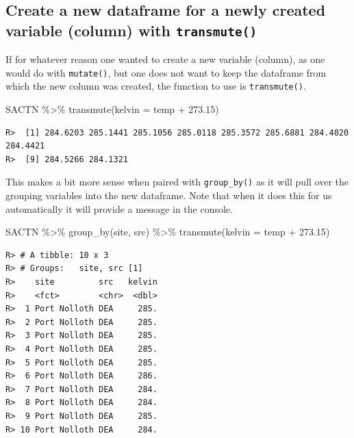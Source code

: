 \documentclass[
]{book}
\newenvironment{Shaded}{\begin{snugshade}}{\end{snugshade}}
\newcommand{\AttributeTok}[1]{\textcolor[rgb]{0.77,0.63,0.00}{#1}}
\newcommand{\FloatTok}[1]{\textcolor[rgb]{0.00,0.00,0.81}{#1}}
\newcommand{\FunctionTok}[1]{\textcolor[rgb]{0.00,0.00,0.00}{#1}}
\newcommand{\NormalTok}[1]{#1}
\newcommand{\SpecialCharTok}[1]{\textcolor[rgb]{0.00,0.00,0.00}{#1}}
\begin{document}
\hypertarget{create-a-new-dataframe-for-a-newly-created-variable-column-with-transmute}{%
\subsection{\texorpdfstring{Create a new dataframe for a newly created variable (column) with \texttt{transmute()}}{Create a new dataframe for a newly created variable (column) with transmute()}}\label{create-a-new-dataframe-for-a-newly-created-variable-column-with-transmute}}

If for whatever reason one wanted to create a new variable (column), as one would do with \texttt{mutate()}, but one does not want to keep the dataframe from which the new column was created, the function to use is \texttt{transmute()}.

\begin{Shaded}
\begin{Highlighting}[]
\NormalTok{SACTN }\SpecialCharTok{\%\textgreater{}\%} 
  \FunctionTok{transmute}\NormalTok{(}\AttributeTok{kelvin =}\NormalTok{ temp }\SpecialCharTok{+} \FloatTok{273.15}\NormalTok{)}
\end{Highlighting}
\end{Shaded}

\begin{verbatim}
R>  [1] 284.6203 285.1441 285.1056 285.0118 285.3572 285.6881 284.4020 284.4421
R>  [9] 284.5266 284.1321
\end{verbatim}

This makes a bit more sense when paired with \texttt{group\_by()} as it will pull over the grouping variables into the new dataframe. Note that when it does this for us automatically it will provide a message in the console.

\begin{Shaded}
\begin{Highlighting}[]
\NormalTok{SACTN }\SpecialCharTok{\%\textgreater{}\%} 
  \FunctionTok{group\_by}\NormalTok{(site, src) }\SpecialCharTok{\%\textgreater{}\%} 
  \FunctionTok{transmute}\NormalTok{(}\AttributeTok{kelvin =}\NormalTok{ temp }\SpecialCharTok{+} \FloatTok{273.15}\NormalTok{)}
\end{Highlighting}
\end{Shaded}

\begin{verbatim}
R> # A tibble: 10 x 3
R> # Groups:   site, src [1]
R>    site         src   kelvin
R>    <fct>        <chr>  <dbl>
R>  1 Port Nolloth DEA     285.
R>  2 Port Nolloth DEA     285.
R>  3 Port Nolloth DEA     285.
R>  4 Port Nolloth DEA     285.
R>  5 Port Nolloth DEA     285.
R>  6 Port Nolloth DEA     286.
R>  7 Port Nolloth DEA     284.
R>  8 Port Nolloth DEA     284.
R>  9 Port Nolloth DEA     285.
R> 10 Port Nolloth DEA     284.
\end{verbatim}
\end{document}
